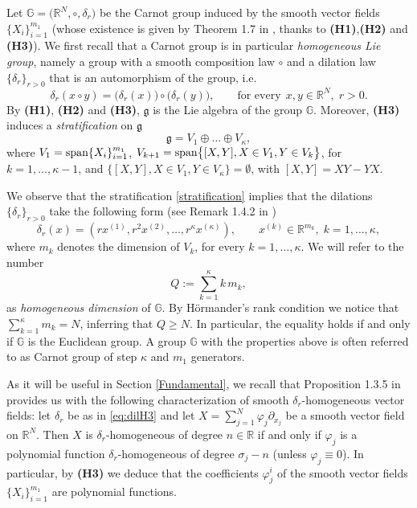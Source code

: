 \documentclass[11pt,a4paper]{article}
\numberwithin{equation}{section}
\newcommand{\R}{\mathbb{R}}
\def \rn {{\mathbb {R}}^{N}}
\def \GG {{\mathbb{G}}}
\def \p {\partial}
\def \span {{\text{\rm span}}}
\def \d {{\delta}}
\def \phi {{\varphi}}
\begin{document}
\medskip

Let $\GG=\big(\rn,\circ,\d_r\big)$ be the Carnot group induced by the smooth vector fields $\{X_i\}_{i=1}^{m_1}$ (whose existence is given by Theorem 1.7 in \cite{bonfiglioli2020hormander}, thanks to \textbf{(H1)},\textbf{(H2)} and \textbf{(H3)}). We first recall that a Carnot group is in particular \textit{homogeneous Lie group}, namely a group with a smooth composition law $\circ$ and a dilation law $\{\d_r\}_{r>0}$ that is an automorphism of the group, i.e.
\begin{equation}
	\d_r(x\circ y)=\big(\d_r(x)\big)\circ \big(\d_r(y)\big),\qquad \text{for every}\,\;x,y \in \rn,\;r>0.
\end{equation}
By \textbf{(H1)}, \textbf{(H2)} and \textbf{(H3)}, $\mathfrak{g}$ is the Lie algebra of the group $\GG$. Moreover, \textbf{(H3)} induces a \emph{stratification} on $\mathfrak{g}$
\begin{equation}\label{stratification}
	\mathfrak{g} = V_1 \oplus \ldots \oplus V_\kappa,
\end{equation}
where $V_1=\span \{X_i\}^{m_1}_{i=1}$, $V_{k+1}=\span \big\{[X,Y], X \in V_1, Y \in V_k\big\}$, for $k=1,\ldots, \kappa-1$, and $\big\{[X,Y], X \in V_1, Y \in V_\kappa\big\}=\emptyset$, with $[X,Y]=XY-YX$. 


We observe that the stratification \eqref{stratification} implies that the dilations  $\{\d_r\}_{r>0}$ take the following form (see Remark 1.4.2 in \cite{bonfiglioli2007stratified})
\begin{equation}\label{dilations-prop}
	\d_r(x)=\left(r x^{(1)}, r^2 x ^{(2)},\ldots,r^\kappa x^{(\kappa)}\right), \qquad x^{(k)}\in \R^{m_k}, \; k=1,\ldots,\kappa,
\end{equation}
where $m_k$ denotes the dimension of $V_k$, for every $k=1,\ldots,\kappa$. We will refer to the number
\begin{equation}
	Q:=\sum_{k=1}^{\kappa} k\,m_k, 
\end{equation}
as \emph{homogeneous dimension} of $\GG$. By H\"ormander's rank condition we notice that $\sum_{k=1}^\kappa m_k = N$, inferring that $Q\geq N$. In particular, the equality holds if and only if $\GG$ is the Euclidean group. A group $\GG$ with the properties above is often referred to as Carnot group of step $\kappa$ and $m_1$ generators.


As it will be useful in Section \ref{Fundamental}, we recall that Proposition 1.3.5 in \cite{bonfiglioli2007stratified} provides us with the following characterization of smooth $\delta_r$-homogeneous vector fields: let $\delta_r$ be as in \eqref{eq:dilH3} and let $X=\sum_{j=1}^N \phi_j\p_{x_j}$ be a smooth vector field on $\rn$. Then $X$ is $\delta_r$-homogeneous of degree $n \in \R$ if and only if $\phi_j$ is a polynomial function $\delta_r$-homogeneous of degree $\sigma_j - n$ (unless $\phi_j \equiv 0$). In particular, by \textbf{(H3)} we deduce that the coefficients $\phi_j^i$ of the smooth vector fields $\{X_i\}_{i=1}^{m_1}$ are polynomial functions.
\end{document}
